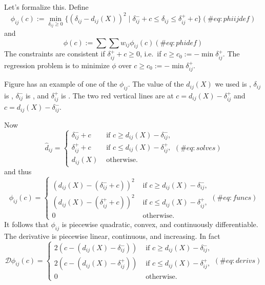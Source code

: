 \documentclass[
  12pt,
  letterpaper,
  DIV=11,
  numbers=noendperiod]{scrartcl}
\begin{document}
Let's formalize this. Define \begin{equation}
\phi_{ij}(c):=\min_{\delta_{ij}\geq 0}\{(\delta_{ij}-d_{ij}(X))^2\mid \delta^-_{ij}+c\leq\delta_{ij}\leq\delta^+_{ij}+c\}
(\#eq:phiijdef)
\end{equation} and \begin{equation}
\phi(c):=\sum\sum w_{ij}\phi_{ij}(c)
(\#eq:phidef)
\end{equation} The constraints are consistent if
\(\delta_{ij}^++c\geq 0\), i.e.~if \(c\geq c_0:=-\min\delta_{ij}^+\).
The regression problem is to minimize \(\phi\) over
\(c\geq c_0:=-\min\delta_{ij}^+\).

Figure has an example of one of the \(\phi_{ij}\). The value of the
\(d_{ij}(X)\) we used is , \(\delta_{ij}\) is , \(\delta_{ij}^-\) is ,
and \(\delta_{ij}^+\) is . The two red vertical lines are at
\(c=d_{ij}(X)-\delta_{ij}^+\) and \(c=d_{ij}(X)-\delta_{ij}^-\).

Now \begin{equation}
\hat d_{ij}=\begin{cases}
\delta_{ij}^-+c&\text{ if }c\geq d_{ij}(X)-\delta_{ij}^-,\\
\delta_{ij}^++c&\text{ if }c\leq d_{ij}(X)-\delta_{ij}^+,\\
d_{ij}(X)&\text{ otherwise}.
\end{cases}
(\#eq:solves)
\end{equation} and thus \begin{equation}
\phi_{ij}(c)=\begin{cases}
(d_{ij}(X)-(\delta_{ij}^-+c))^2&\text{ if }c\geq d_{ij}(X)-\delta_{ij}^-,\\
(d_{ij}(X)-(\delta_{ij}^++c))^2&\text{ if }c\leq d_{ij}(X)-\delta_{ij}^+,\\
0&\text{ otherwise}.
\end{cases}
(\#eq:funcs)
\end{equation} It follows that \(\phi_{ij}\) is piecewise quadratic,
convex, and continuously differentiable. The derivative is piecewise
linear, continuous, and increasing. In fact \begin{equation}
\mathcal{D}\phi_{ij}(c)=\begin{cases}
2(c-(d_{ij}(X)-\delta_{ij}^-))&\text{ if }c\geq d_{ij}(X)-\delta_{ij}^-,\\
2(c-(d_{ij}(X)-\delta_{ij}^+))&\text{ if }c\leq d_{ij}(X)-\delta_{ij}^+,\\
0&\text{ otherwise}.
\end{cases}
(\#eq:derivs)
\end{equation}
\end{document}
